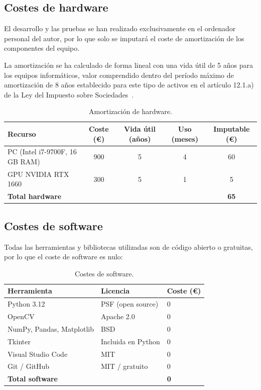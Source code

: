 \subsection{Costes de hardware}

El desarrollo y las pruebas se han realizado exclusivamente en el ordenador personal del autor, por lo que solo se imputará el coste de amortización de los componentes del equipo.

La amortización se ha calculado de forma lineal con una vida útil de
5 años para los equipos informáticos, valor comprendido dentro del
período máximo de amortización de 8 años establecido para este tipo
de activos en el artículo 12.1.a) de la Ley del Impuesto sobre
Sociedades~\cite{lis2014}.

\begin{table}[H]
\centering
\caption{Amortización de hardware.}
\begin{tabular}{lcccc}
\hline
\textbf{Recurso} & \textbf{Coste (€)} & \textbf{Vida útil (años)} & \textbf{Uso (meses)} & \textbf{Imputable (€)} \\
\hline
PC (Intel i7-9700F, 16\,GB RAM) & 900 & 5 & 4 & 60 \\
GPU NVIDIA RTX 1660             & 300 & 5 & 1 &  5 \\
\hline
\textbf{Total hardware}         &     &   &   & \textbf{65} \\
\hline
\end{tabular}
\label{tab:costes_hardware}
\end{table}

\subsection{Costes de software}
 
Todas las herramientas y bibliotecas utilizadas son de código abierto o gratuitas, por lo que el coste de software es nulo:
 
\begin{table}[H]
\centering
\caption{Costes de software.}
\begin{tabular}{lll}
\hline
\textbf{Herramienta} & \textbf{Licencia} & \textbf{Coste (€)} \\
\hline
Python 3.12          & PSF (open source) & 0 \\
OpenCV               & Apache 2.0        & 0 \\
NumPy, Pandas, Matplotlib & BSD          & 0 \\
Tkinter              & Incluida en Python & 0 \\
Visual Studio Code   & MIT               & 0 \\
Git / GitHub         & MIT / gratuito    & 0 \\
\hline
\textbf{Total software} &                & \textbf{0} \\
\hline
\end{tabular}
\label{tab:costes_software}
\end{table}

